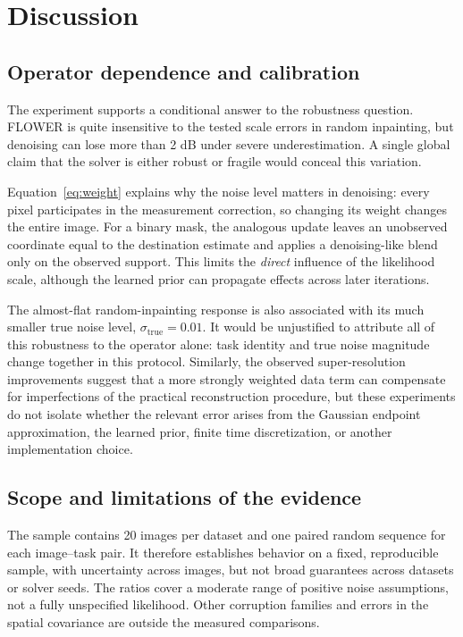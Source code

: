 \documentclass[10pt,letterpaper]{article}
\newcommand{\st}{\sigma_{\mathrm{true}}}
\begin{document}
\section{Discussion}
\subsection{Operator dependence and calibration}
The experiment supports a conditional answer to the robustness question. FLOWER is quite insensitive to the tested scale errors in random inpainting, but denoising can lose more than 2 dB under severe underestimation. A single global claim that the solver is either robust or fragile would conceal this variation.

Equation~\eqref{eq:weight} explains why the noise level matters in denoising: every pixel participates in the measurement correction, so changing its weight changes the entire image. For a binary mask, the analogous update leaves an unobserved coordinate equal to the destination estimate and applies a denoising-like blend only on the observed support. This limits the \emph{direct} influence of the likelihood scale, although the learned prior can propagate effects across later iterations.

The almost-flat random-inpainting response is also associated with its much smaller true noise level, $\st=0.01$. It would be unjustified to attribute all of this robustness to the operator alone: task identity and true noise magnitude change together in this protocol. Similarly, the observed super-resolution improvements suggest that a more strongly weighted data term can compensate for imperfections of the practical reconstruction procedure, but these experiments do not isolate whether the relevant error arises from the Gaussian endpoint approximation, the learned prior, finite time discretization, or another implementation choice.

\subsection{Scope and limitations of the evidence}
The sample contains 20 images per dataset and one paired random sequence for each image--task pair. It therefore establishes behavior on a fixed, reproducible sample, with uncertainty across images, but not broad guarantees across datasets or solver seeds. The ratios cover a moderate range of positive noise assumptions, not a fully unspecified likelihood. Other corruption families and errors in the spatial covariance are outside the measured comparisons.
\end{document}
